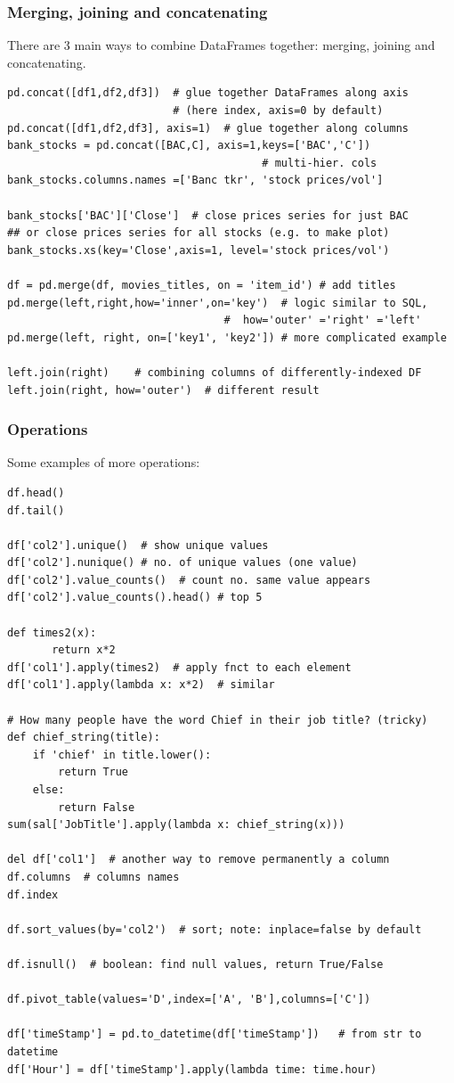 \documentclass[11pt]{article}
\begin{document}
\subsubsection{Merging, joining and concatenating}
There are 3 main ways to combine DataFrames together: merging, joining and concatenating.
\begin{lstlisting}
pd.concat([df1,df2,df3])  # glue together DataFrames along axis 
                          # (here index, axis=0 by default)
pd.concat([df1,df2,df3], axis=1)  # glue together along columns
bank_stocks = pd.concat([BAC,C], axis=1,keys=['BAC','C']) 
									    # multi-hier. cols
bank_stocks.columns.names =['Banc tkr', 'stock prices/vol']

bank_stocks['BAC']['Close']  # close prices series for just BAC
## or close prices series for all stocks (e.g. to make plot)
bank_stocks.xs(key='Close',axis=1, level='stock prices/vol') 

df = pd.merge(df, movies_titles, on = 'item_id') # add titles
pd.merge(left,right,how='inner',on='key')  # logic similar to SQL, 
                                  #  how='outer' ='right' ='left'
pd.merge(left, right, on=['key1', 'key2']) # more complicated example

left.join(right)    # combining columns of differently-indexed DF
left.join(right, how='outer')  # different result
\end{lstlisting}

\subsubsection{Operations}
Some examples of more operations:
\begin{lstlisting}
df.head()
df.tail()

df['col2'].unique()  # show unique values
df['col2'].nunique() # no. of unique values (one value)
df['col2'].value_counts()  # count no. same value appears
df['col2'].value_counts().head() # top 5

def times2(x): 
       return x*2
df['col1'].apply(times2)  # apply fnct to each element
df['col1'].apply(lambda x: x*2)  # similar

# How many people have the word Chief in their job title? (tricky)
def chief_string(title):
	if 'chief' in title.lower():
		return True
	else:
		return False
sum(sal['JobTitle'].apply(lambda x: chief_string(x)))

del df['col1']  # another way to remove permanently a column
df.columns  # columns names
df.index 

df.sort_values(by='col2')  # sort; note: inplace=false by default

df.isnull()  # boolean: find null values, return True/False

df.pivot_table(values='D',index=['A', 'B'],columns=['C'])

df['timeStamp'] = pd.to_datetime(df['timeStamp'])   # from str to datetime
df['Hour'] = df['timeStamp'].apply(lambda time: time.hour)
\end{lstlisting}
\end{document}
